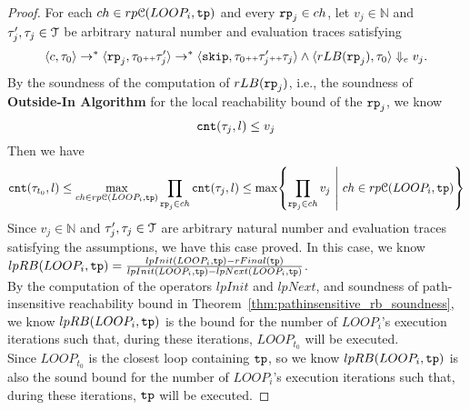 \begin{proof}
    For each $ch \in rp\mathcal{C}(LOOP_i, \mathtt{tp})$ and 
    every $\mathtt{rp}_j \in ch$, let $ v_j \in \mathbb{N}$  and 
            $\mathtt{\tau}_j', \mathtt{\tau}_j \in \mathcal{T}$ be arbitrary natural number
            and evaluation traces satisfying 
            \[
                \langle  c, \mathtt{\tau}_0 \rangle \to^{*} 
                \langle \mathtt{rp}_j, \mathtt{\tau}_0 {\scriptscriptstyle ++} \mathtt{\tau}_j' \rangle \to^*
                \langle \mathtt{skip}, \mathtt{\tau}_0 {\scriptscriptstyle ++} \mathtt{\tau}_j' {\scriptscriptstyle ++} \mathtt{\tau}_j \rangle
                \land
                 \langle rLB(\mathtt{rp}_j),\mathtt{\tau}_0  \rangle \Downarrow_e v_j.
            \]
        By the soundness of the computation of $rLB(\mathtt{rp}_j)$, 
       i.e., the soundness of \textbf{Outside-In Algorithm} for the local reachability
                  bound of the $\mathtt{rp}_j$, we know 
                  \[
                    \mathtt{cnt}(\mathtt{\tau}_j, l) \leq v_j
                    \]
Then we have 
\[
    \counter(\vtrace_{t_0}, l) 
    \leq \max_{ch \in rp\mathcal{C}(LOOP_i, \tpath)} 
    \prod\limits_{\rprog_j \in ch}
    \counter(\vtrace_j, l) \leq 
    \max \left\{ \prod\limits_{\rprog_j \in ch}  v_j 
        ~\middle\vert~ ch \in rp\mathcal{C}(LOOP_i, \tpath) \right\}
    \]
Since $ v_j \in \mathbb{N}$  and 
$\mathtt{\tau}_j', \mathtt{\tau}_j \in \mathcal{T}$ are arbitrary natural number
and evaluation traces satisfying the assumptions, we have this case proved.
%
        In this case, we know 
        $lpRB(LOOP_i, \mathtt{tp}) =
        \frac{lpInit(LOOP_i, \mathtt{tp}) - rFinal(\mathtt{tp})}{lpInit(LOOP_i, \mathtt{tp}) - lpNext(LOOP_i, \mathtt{tp})}$.
        \\
        By the computation of the operators $lpInit$ and $lpNext$, and soundness of path-insensitive reachability bound 
        in Theorem~\ref{thm:pathinsensitive_rb_soundness}, 
        we know 
        $lpRB(LOOP_i, \mathtt{tp})$ is the
        bound for the number of $LOOP_i$'s execution iterations
        such that, during these iterations, $LOOP_{t_0}$ will be executed. 
        \\
        Since $LOOP_{t_0}$ is the closest loop containing $\mathtt{tp}$, so we know 
        $lpRB(LOOP_i, \mathtt{tp})$  is also the sound bound for the number of $LOOP_i$'s execution iterations
        such that, during these iterations, $\mathtt{tp}$ will be executed. 

\end{proof}
